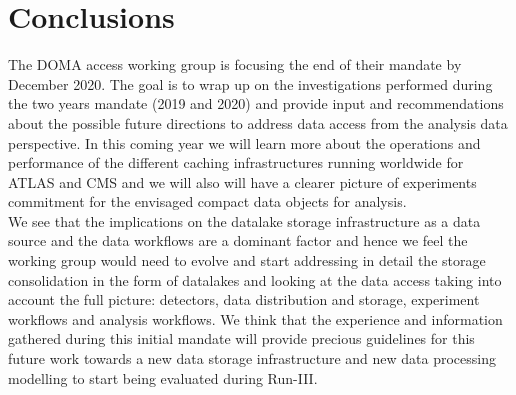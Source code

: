 \section{Conclusions}
The DOMA access working group is focusing the end of their mandate by December 2020. The goal is to wrap up on the investigations performed during the two years mandate (2019 and 2020) and provide input and recommendations about the possible future directions to address data access from the analysis data perspective. In this coming year we will learn more about the operations and performance of the different caching infrastructures running worldwide for ATLAS and CMS and we will also will have a clearer picture of experiments commitment for the envisaged compact data objects for analysis.\\
We see that the implications on the datalake storage infrastructure as a data source and the data workflows are a dominant factor and hence we feel the working group would need to evolve and start addressing in detail the storage consolidation in the form of datalakes and looking at the data access taking into account the full picture: detectors, data distribution and storage, experiment workflows and analysis workflows. We think that the experience and information gathered during this initial mandate will provide precious guidelines for this future work towards a new data storage infrastructure and new data processing modelling to start being evaluated during Run-III.